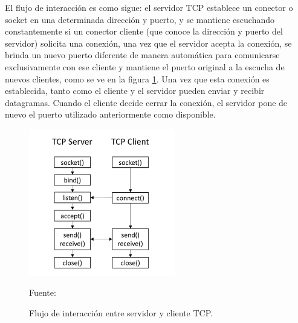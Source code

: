 

El flujo de interacción es como sigue: el servidor TCP establece un conector o socket en una determinada dirección y puerto, y se mantiene escuchando constantemente si un conector cliente (que conoce la dirección y puerto del servidor) solicita una conexión, una vez que el servidor acepta la conexión, se brinda un nuevo puerto diferente de manera automática para comunicarse exclusivamente con ese cliente y mantiene el puerto original a la escucha de nuevos clientes, como se ve en la figura \ref{fig:tcp_flow}. Una vez que esta conexión es establecida, tanto como el cliente y el servidor pueden enviar y recibir datagramas. Cuando el cliente decide cerrar la conexión, el servidor pone de nuevo el puerto utilizado anteriormente como disponible.\\

\begin{figure}[H]
    \begin{center}
        \includegraphics[width=6.4cm]{img/capitulo_2/tcp.png}
        \caption{Flujo de interacción entre servidor y cliente TCP.\\}
        Fuente: \cite{tcpsocket}
        \label{fig:tcp_flow}
    \end{center}
\end{figure}


